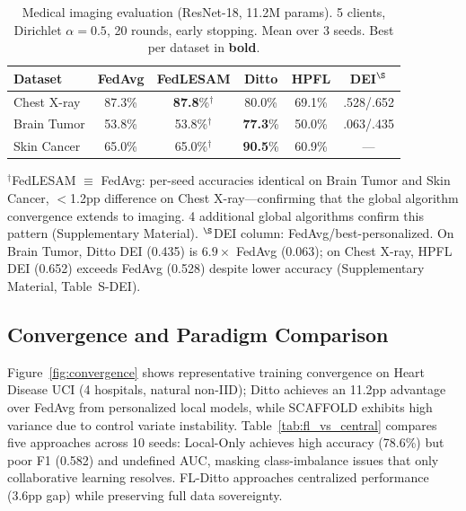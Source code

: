 \documentclass[conference]{IEEEtran}
\begin{document}
\begin{table}[htbp]
\centering
\caption{Medical imaging evaluation (ResNet-18, 11.2M params). 5 clients, Dirichlet $\alpha{=}0.5$, 20 rounds, early stopping. Mean over 3 seeds. Best per dataset in \textbf{bold}.}
\label{tab:imaging_main}
\small
\begin{tabular}{lccccc}
\toprule
\textbf{Dataset} & \textbf{FedAvg} & \textbf{FedLESAM} & \textbf{Ditto} & \textbf{HPFL} & \textbf{DEI$^\S$} \\
\midrule
Chest X-ray & 87.3\% & \textbf{87.8}\%$^\dagger$ & 80.0\% & 69.1\% & .528/.652 \\
Brain Tumor & 53.8\% & 53.8\%$^\dagger$ & \textbf{77.3}\% & 50.0\% & .063/.435 \\
Skin Cancer & 65.0\% & 65.0\%$^\dagger$ & \textbf{90.5}\% & 60.9\% & --- \\
\bottomrule
\end{tabular}

\vspace{1mm}
\footnotesize{$^\dagger$FedLESAM $\equiv$ FedAvg: per-seed accuracies identical on Brain Tumor and Skin Cancer, $<$1.2pp difference on Chest X-ray---confirming that the global algorithm convergence extends to imaging. 4 additional global algorithms confirm this pattern (Supplementary Material). $^\S$DEI column: FedAvg/best-personalized. On Brain Tumor, Ditto DEI (0.435) is $6.9\times$ FedAvg (0.063); on Chest X-ray, HPFL DEI (0.652) exceeds FedAvg (0.528) despite lower accuracy (Supplementary Material, Table~S-DEI).}
\end{table}

\subsection{Convergence and Paradigm Comparison}

Figure~\ref{fig:convergence} shows representative training convergence on Heart Disease UCI (4 hospitals, natural non-IID); Ditto achieves an 11.2pp advantage over FedAvg from personalized local models, while SCAFFOLD exhibits high variance due to control variate instability. Table~\ref{tab:fl_vs_central} compares five approaches across 10 seeds: Local-Only achieves high accuracy (78.6\%) but poor F1 (0.582) and undefined AUC, masking class-imbalance issues that only collaborative learning resolves. FL-Ditto approaches centralized performance (3.6pp gap) while preserving full data sovereignty.
\end{document}
